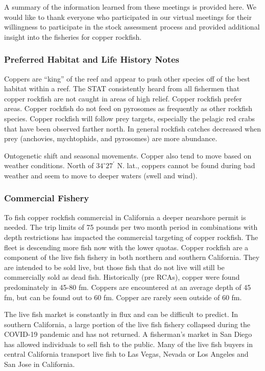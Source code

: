 \documentclass[11pt,
  english,
  letterpaper,
]{article}
\begin{document}
A summary of the information learned from these meetings is provided here. We would like to thank everyone who participated in our virtual meetings for their willingness to participate in the stock assessment process and provided additional insight into the fisheries for copper rockfish.

\hypertarget{preferred-habitat-and-life-history-notes}{%
\subsubsection{Preferred Habitat and Life History Notes}\label{preferred-habitat-and-life-history-notes}}

Coppers are ``king'' of the reef and appear to push other species off of the best habitat within a reef. The STAT consistently heard from all fishermen that copper rockfish are not caught in areas of high relief. Copper rockfish prefer areas. Copper rockfish do not feed on pyrosomes as frequently as other rockfish species. Copper rockfish will follow prey targets, especially the pelagic red crabs that have been observed farther north. In general rockfish catches decreased when prey (anchovies, mychtophids, and pyrosomes) are more abundance.

Ontogenetic shift and seasonal movements. Copper also tend to move based on weather conditions. North of $34^\circ 27^\prime$ N. lat., coppers cannot be found during bad weather and seem to move to deeper waters (swell and wind).

\hypertarget{commercial-fishery-1}{%
\subsubsection{Commercial Fishery}\label{commercial-fishery-1}}

To fish copper rockfish commercial in California a deeper nearshore permit is needed. The trip limits of 75 pounds per two month period in combinations with depth restrictions has impacted the commercial targeting of copper rockfish. The fleet is descending more fish now with the lower quotas. Copper rockfish are a component of the live fish fishery in both northern and southern California. They are intended to be sold live, but those fish that do not live will still be commercially sold as dead fish. Historically (pre RCAs), copper were found predominately in 45-80 fm. Coppers are encountered at an average depth of 45 fm, but can be found out to 60 fm. Copper are rarely seen outside of 60 fm.

The live fish market is constantly in flux and can be difficult to predict. In southern California, a large portion of the live fish fishery collapsed during the COVID-19 pandemic and has not returned. A fisherman's market in San Diego has allowed individuals to sell fish to the public. Many of the live fish buyers in central California transport live fish to Las Vegas, Nevada or Los Angeles and San Jose in California.
\end{document}
